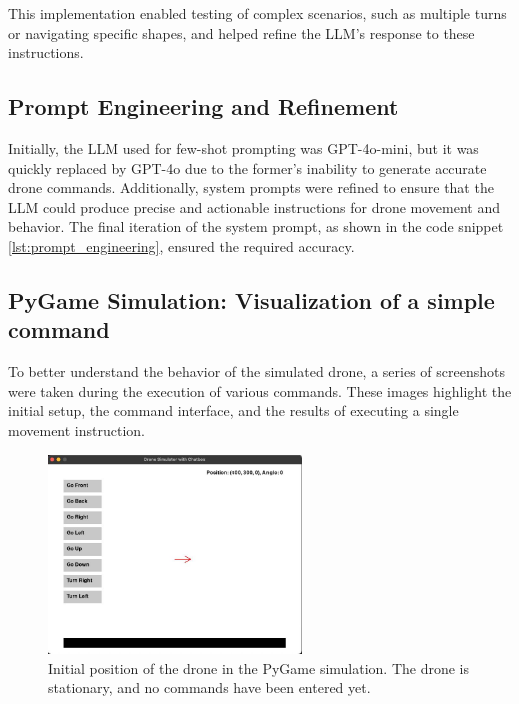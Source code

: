 This implementation enabled testing of complex scenarios, such as multiple turns or navigating specific shapes, and helped refine the \ac{LLM}'s response to these instructions.

\subsection{Prompt Engineering and Refinement}
Initially, the \ac{LLM} used for few-shot prompting was GPT-4o-mini, but it was quickly replaced by GPT-4o due to the former's inability to generate accurate drone commands. 
Additionally, system prompts were refined to ensure that the \ac{LLM} could produce precise and actionable instructions for drone movement and behavior. 
The final iteration of the system prompt, as shown in the code snippet \ref{lst:prompt_engineering}, ensured the required accuracy.

\subsection{PyGame Simulation: Visualization of a simple command}
To better understand the behavior of the simulated drone, a series of screenshots were taken during the execution of various commands. 
These images highlight the initial setup, the command interface, and the results of executing a single movement instruction.

\begin{figure}[H]
    \centering
    \includegraphics[width=0.6\textwidth]{img/sim_pos_start.jpeg}
    \caption{Initial position of the drone in the PyGame simulation. The drone is stationary, and no commands have been entered yet.}
    \label{fig:sim_pos_start}
\end{figure}

